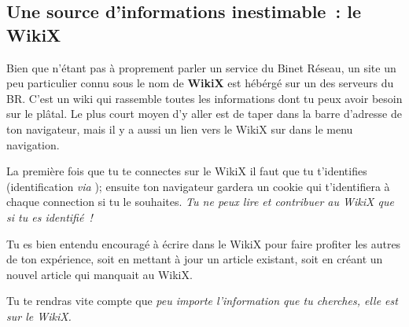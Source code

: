 
\subsection{Une source d'informations inestimable~: le WikiX}
\label{WikiX}

Bien que n'étant pas à proprement parler un service du Binet Réseau, un site un peu particulier connu sous le nom de \textbf{WikiX} est hébérgé sur un des serveurs du BR.
C'est un wiki qui rassemble toutes les informations dont tu peux avoir besoin sur le plâtal.
Le plus court moyen d'y aller est de taper  dans la barre d'adresse de ton navigateur, mais il y a aussi un lien vers le WikiX sur \fkz dans le menu navigation.

La première fois que tu te connectes sur le WikiX il faut que tu t'identifies (identification \emph{via} );
ensuite ton navigateur gardera un cookie qui t'identifiera à chaque connection si tu le souhaites. \emph{Tu ne peux lire et contribuer au WikiX que si tu es identifié~!}

Tu es bien entendu encouragé à écrire dans le WikiX pour faire profiter les autres de ton expérience,
soit en mettant à jour un article existant, soit en créant un nouvel article qui manquait au WikiX.

Tu te rendras vite compte que \emph{peu importe l'information que tu cherches, elle est sur le WikiX.}
